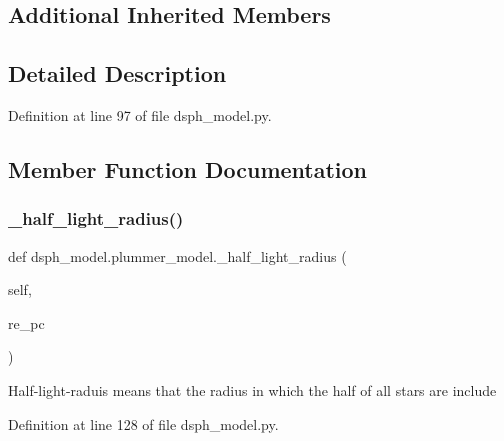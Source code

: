 \subsection*{Additional Inherited Members}


\subsection{Detailed Description}


Definition at line 97 of file dsph\+\_\+model.\+py.



\subsection{Member Function Documentation}
\mbox{\label{classdsph__model_1_1plummer__model_adabdd3103020e64743568b23f2fe1131}} 
\subsubsection{\texorpdfstring{\+\_\+half\+\_\+light\+\_\+radius()}{\_half\_light\_radius()}}
{\footnotesize\ttfamily def dsph\+\_\+model.\+plummer\+\_\+model.\+\_\+half\+\_\+light\+\_\+radius (\begin{DoxyParamCaption}\item[{}]{self,  }\item[{}]{re\+\_\+pc }\end{DoxyParamCaption})\hspace{0.3cm}{\ttfamily [private]}}

\begin{DoxyVerb}Half-light-raduis means that the radius in which the half of all stars are include
\end{DoxyVerb}
 

Definition at line 128 of file dsph\+\_\+model.\+py.


